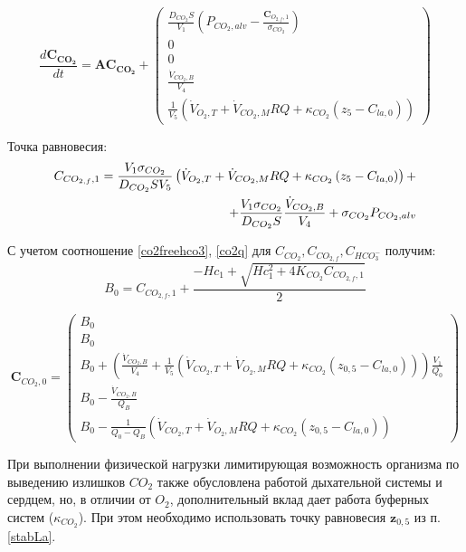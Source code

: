 \begin{equation}
\displaystyle \frac{d\mathbf{C_{CO_{2}}}}{dt}
=\mathbf{A} \mathbf{C_{CO_{2}}}+\begin{pmatrix}
\displaystyle \frac{D_{CO_{2}}S}{V_{1}}\left(P_{CO_{2},alv}-\frac{\mathbf{C}_{O_{2,f},1}}{\sigma_{CO_{2}}} \right) \\
0 \\
0 \\
\displaystyle \frac{\dot{V}_{CO_{2},B}}{V_{4}} \\
\displaystyle \frac{1}{V_{5}}\left(\dot{V}_{O_{2},T}+\dot{V}_{CO_{2},M}RQ+\kappa_{CO_{2}}\left(z_{5}-C_{la,0}\right)\right)
\end{pmatrix}
\end{equation}

Точка равновесия:
\begin{eqnarray}
C_{CO_{2,f},1}= \frac{V_{1}\sigma_{CO_{2}}}{D_{CO_{2}}S{V_{5}}\displaystyle}\left(\dot{V}_{O_{2},T}+\dot{V}_{CO_{2},M}RQ+\kappa_{CO_{2}}\left(z_{5}-C_{la,0}\right)\right)+\\
+\frac{V_{1}\sigma_{CO_{2}}}{D_{CO_{2}}S}\displaystyle \frac{\dot{V}_{CO_{2},B}}{V_{4}}+\displaystyle \sigma_{CO_{2}}P_{CO_{2},alv} \notag
\end{eqnarray}

С учетом соотношение \eqref{co2freehco3}, \eqref{co2q} для \(C_{CO_{2}}, C_{CO_{2,f}}, C_{HCO_{3}^{-}} \) получим:
\begin{equation}
B_{0}=C_{CO_{2,f},1}+\frac{-Hc_{1}+\sqrt{Hc_{1}^{2}+4K_{CO_{2}}C_{CO_{2,f},1}}}{2}
\end{equation}

\begin{equation}
\displaystyle \mathbf{C}_{CO_{2},0}
=\begin{pmatrix}
B_{0} \\
B_{0} \\
B_{0}+\left(\displaystyle \frac{\dot{V}_{CO_{2},B}}{V_{4}} +
    \displaystyle \frac{1}{V_{5}}\left(\dot{V}_{CO_{2},T}+\dot{V}_{O_{2},M}RQ+\kappa_{CO_{2}}\left(z_{0,5}-C_{la,0}\right) \right)\right)\frac{V_{1}}{Q_{0}}\\
B_{0}-\frac{\dot{V}_{CO_{2},B}}{Q_{B}} \\
B_{0}-\frac{1}{Q_{0}-Q_{B}}\left(\dot{V}_{CO_{2},T}+\dot{V}_{O_{2},M}RQ+\kappa_{CO_{2}}\left(z_{0,5}-C_{la,0}\right) \right)
\end{pmatrix}
\end{equation}

При выполнении физической нагрузки лимитирующая возможность организма по выведению излишков \(CO_{2}\) также  обусловлена работой дыхательной системы и сердцем, но, в отличии от \(O_{2}\), дополнительный вклад дает работа буферных систем (\(\kappa_{CO_{2}}\)). При этом необходимо использовать точку равновесия \(\mathbf{z}_{0,5}\) из п.\ref{stabLa}.



